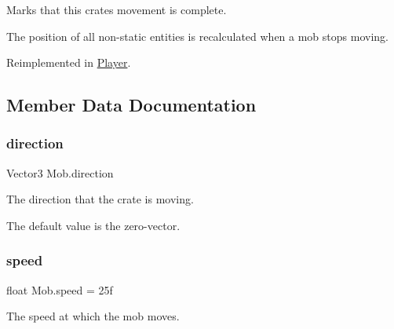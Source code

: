 Marks that this crate\textquotesingle{}s movement is complete. 

The position of all non-\/static entities is recalculated when a mob stops moving. 

Reimplemented in \mbox{\hyperlink{class_player_a10405c2b24c0b79a4b7033f733aceaf4}{Player}}.



\subsection{Member Data Documentation}
\mbox{\label{class_mob_a9e4730b2cbbb1230028177caf997a70e}} 
\subsubsection{\texorpdfstring{direction}{direction}}
{\footnotesize\ttfamily Vector3 Mob.\+direction}



The direction that the crate is moving. 

The default value is the zero-\/vector. \mbox{\label{class_mob_ae3126d5dea1c7abcbde5a73de0c1a791}} 
\subsubsection{\texorpdfstring{speed}{speed}}
{\footnotesize\ttfamily float Mob.\+speed = 25f}



The speed at which the mob moves. 

